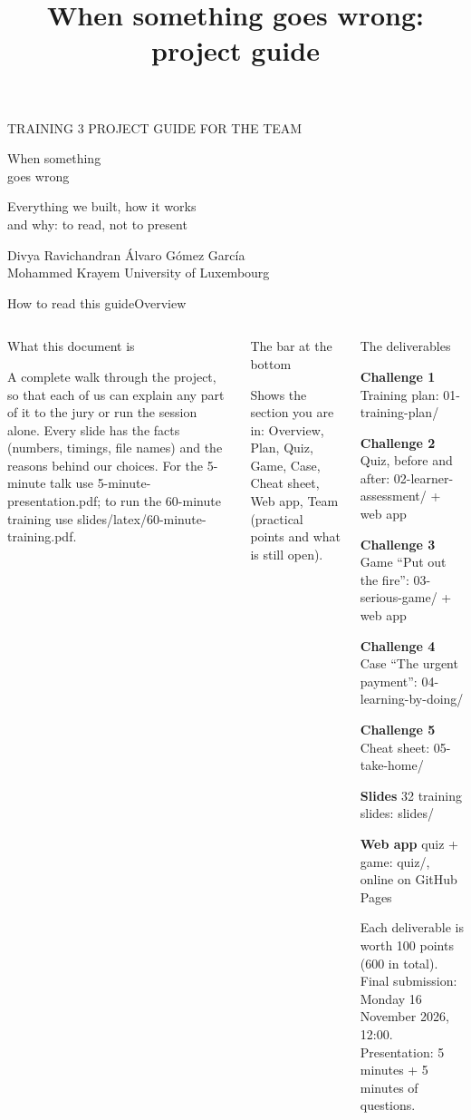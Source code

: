 \documentclass[aspectratio=169,11pt,t]{beamer}
\title{When something goes wrong: project guide}
\newcommand\explain[2]{%
  \begin{tcolorbox}[enhanced, colback=white, colframe=white, arc=2mm, boxrule=0pt, left=2.5mm, right=2.5mm, top=1.5mm, bottom=1.5mm,
      before skip=0pt, after skip=1.6mm, drop fuzzy shadow={black!30}, before upper=\raggedright]
    {\headfont\fontsize{8}{10}\selectfont\color{navy}#1\par}\vspace{.5mm}
    {\fontsize{7}{8.6}\selectfont #2\par}
  \end{tcolorbox}}
\newcommand\bul[2]{\par\noindent\makebox[3.5mm][l]{\textcolor{#1}{\tiny\faCircle}}\parbox[t]{\dimexpr\linewidth-3.5mm}{\raggedright #2}\par\vspace{.4mm}}
\newcommand\file[1]{{\ttfamily\color{navy}#1}}
\begin{document}
{\darkslide
\begin{frame}[plain,c]
  \vspace*{-2mm}
  {\kickerfont\fontsize{8}{10}\selectfont\color{alert}TRAINING 3 \textbullet{} PROJECT GUIDE FOR THE TEAM}\par\vspace{4mm}
  \begin{minipage}{100mm}\raggedright
    {\headfont\fontsize{27}{32}\selectfont When something\\ goes wrong\par}\par\vspace{3mm}
    {\lightfont\fontsize{14}{18}\selectfont\color{soft}Everything we built, how it works\\ and why: to read, not to present\par}\par\vspace{8mm}
    {\small\color{soft}Divya Ravichandran \textbullet{} Álvaro Gómez García\\Mohammed Krayem \textbullet{} University of Luxembourg\par}
  \end{minipage}
\end{frame}
}

\begin{frame}{How to read this guide}{Overview}
  \vspace{1mm}
  \begin{columns}[T,onlytextwidth]
    \explain{What this document is}{A complete walk through the project, so that each of us can explain any part of it to the jury or run the session alone.
      Every slide has the facts (numbers, timings, file names) and the reasons behind our choices. For the 5-minute talk use \file{5-minute-presentation.pdf}; to run the 60-minute training use \file{slides/latex/60-minute-training.pdf}.}
    \explain{The bar at the bottom}{Shows the section you are in: Overview, Plan, Quiz, Game, Case, Cheat sheet, Web app, Team (practical points and what is still open).}
    \explain{The deliverables}{%
      \bul{navy}{\textbf{Challenge 1} Training plan: \file{01-training-plan/}}
      \bul{alert}{\textbf{Challenge 2} Quiz, before and after: \file{02-learner-assessment/} + web app}
      \bul{alert}{\textbf{Challenge 3} Game ``Put out the fire'': \file{03-serious-game/} + web app}
      \bul{alert}{\textbf{Challenge 4} Case ``The urgent payment'': \file{04-learning-by-doing/}}
      \bul{good}{\textbf{Challenge 5} Cheat sheet: \file{05-take-home/}}
      \bul{navydark}{\textbf{Slides} 32 training slides: \file{slides/}}
      \bul{navydark}{\textbf{Web app} quiz + game: \file{quiz/}, online on GitHub Pages}
      Each deliverable is worth 100 points (600 in total). Final submission: Monday 16 November 2026, 12:00. Presentation: 5 minutes + 5 minutes of questions.}
  \end{columns}
\end{frame}
\end{document}
